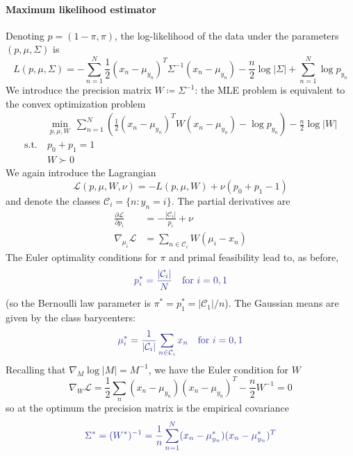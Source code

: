 \documentclass[11pt]{article}
\newcommand{\suchthat}{\mathrm{s.t.}}
\newcommand{\calL}{\mathcal{L}}
\newcommand{\calC}{\mathcal{C}}
\begin{document}
\paragraph{Maximum likelihood estimator} Denoting $p = (1-\pi, \pi)$, the log-likelihood of the data under the parameters $(p, \mu, \Sigma)$ is
\begin{equation}
L(p, \mu, \Sigma) =
-\sum_{n=1}^N
\frac{1}{2}(x_n - \mu_{y_n})^T\Sigma^{-1}(x_n - \mu_{y_n}) - \frac{n}{2}\log|\Sigma|
+ \sum_{n=1}^N \log p_{y_n}
\end{equation}
We introduce the precision matrix $W \coloneqq \Sigma^{-1}$: the MLE problem is equivalent to the convex optimization problem
\begin{equation}
\begin{aligned}
	&\min_{p,\mu,W}~
	\sum_{n=1}^N \left(
	\frac{1}{2}(x_n-\mu_{y_n})^TW(x_n-\mu_{y_n}) - \log p_{y_n}
	\right)
	- \frac{n}{2}\log|W| \\
	\suchthat\ & p_0 + p_1 = 1 \\
	&W \succ 0
\end{aligned}
\end{equation}
We again introduce the Lagrangian
\[
	\calL(p, \mu, W, \nu) =
	-L(p, \mu, W) + \nu(p_0 + p_1 - 1)
\]
and denote the classes $\mathcal{C}_i = \{n: y_n = i\}$. The partial derivatives are
\begin{equation}
\begin{aligned}
\frac{\partial\calL}{\partial p_i} &= -\frac{|\calC_i|}{p_i} + \nu  \\
\nabla_{\mu_i}\calL &= \sum_{n\in\calC_i} W(\mu_i - x_n)
\end{aligned}
\end{equation}
The Euler optimality conditions for $\pi$ and primal feasibility lead to, as before,
\begin{equation}
{\color{Blue}
	p^*_i = \frac{|\calC_i|}{N}
	\quad \text{for } i = 0,1
}
\end{equation}
(so the Bernoulli law parameter is $\pi^* = p^*_1 = |\calC_1|/n$). The Gaussian means are given by the class barycenters:
\begin{equation}
{\color{Blue}
	\mu^*_i = \frac{1}{|\calC_i|}\sum_{n\in\calC_i} x_n
	\quad \text{for } i = 0,1
}
\end{equation}
Recalling that $\nabla_M \log|M| = M^{-1}$, we have the Euler condition for $W$
\[
	\nabla_W\calL =
	\frac{1}{2}\sum_n (x_n-\mu_{y_n})(x_n-\mu_{y_n})^T - \frac{n}{2}W^{-1}
	= 0
\]
so at the optimum the precision matrix is the empirical covariance
\begin{equation}
{\color{Blue}
	\Sigma^* = (W^*)^{-1} =
	\frac{1}{n} \sum_{n=1}^N (x_n - \mu^*_{y_n})(x_n - \mu^*_{y_n})^T
}
\end{equation}
\end{document}
